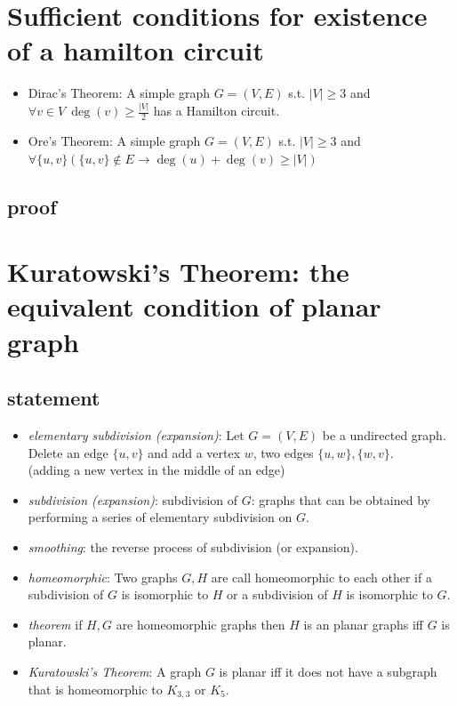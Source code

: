\documentclass{article}
\begin{document}
\newpage
\section{Sufficient conditions for existence of a hamilton circuit }

\begin{itemize}
	\item Dirac's Theorem:
	      A simple graph $G=(V,E)$ s.t. $|V|\geq 3$ and $\forall v\in V\ \deg(v)\geq \frac{|V|}{2}$ has a Hamilton circuit.
	\item Ore's Theorem:
	      A simple graph $G=(V,E)$ s.t. $|V|\geq 3$ and $\forall \{u,v\}\left( \{u,v\}\not\in E\rightarrow \deg(u)+\deg(v)\geq |V|\right)$
\end{itemize}

\subsection{proof}

\newpage
\section{Kuratowski's Theorem: the equivalent condition of planar graph}


\subsection{statement}

\begin{itemize}
	\item \emph{elementary subdivision (expansion)}: Let $G=(V,E)$ be a undirected graph.\\
	      Delete an edge $\{u,v\}$ and add a vertex $w$, two edges $\{u,w\},\{w,v\}$.\\
	      (adding a new vertex in the middle of an edge)
	\item \emph{subdivision (expansion)}: subdivision of $G$: graphs that can be obtained by performing a series of elementary subdivision on $G$.
	\item \emph{smoothing}: the reverse process of subdivision (or expansion).
	\item \emph{homeomorphic}: Two graphs $G,H$ are call homeomorphic to each other
	      if a subdivision of $G$ is isomorphic to $H$
	      or a subdivision of $H$ is isomorphic to $G$.
	\item \emph{theorem} if $H,G$ are homeomorphic graphs then $H$ is an planar graphs iff $G$ is planar.
	\item \emph{Kuratowski's Theorem}: A graph $G$ is planar iff it does not have a subgraph that is homeomorphic to $K_{3,3}$ or $K_5$.
\end{itemize}
\end{document}
